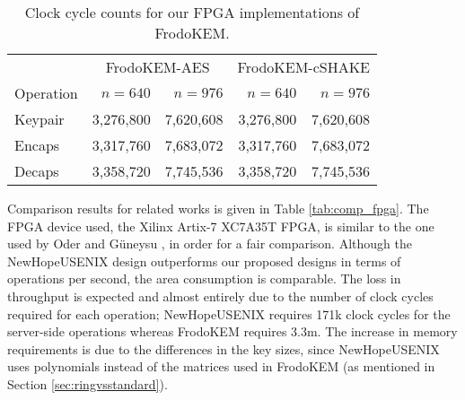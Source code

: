 \begin{table}[tbhp]
\caption{Clock cycle counts for our FPGA implementations of \textsf{FrodoKEM}.}
\label{tab:clks_fpga}
\begin{center}
\begin{tabular}{|l|r|r|r|r|}
\hline
& \multicolumn{2}{c|}{\textsf{FrodoKEM-AES}} &\multicolumn{2}{c|}{\textsf{FrodoKEM-cSHAKE}} \\
Operation	  & $n=640$ & $n=976$ & $n=640$ & $n=976$\\
\hline
Keypair							& 3,276,800 & 7,620,608 & 3,276,800 & 7,620,608 \\
Encaps							& 3,317,760 & 7,683,072 & 3,317,760 & 7,683,072 \\
Decaps							& 3,358,720 & 7,745,536 & 3,358,720 & 7,745,536 \\
\hline
\end{tabular}
\end{center}
\end{table}

Comparison results for related works is given in Table \ref{tab:comp_fpga}. The FPGA device used, the Xilinx Artix-7 XC7A35T FPGA, is similar to the one used by Oder and G{\"u}neysu \cite{oder2017implementing}, in order for a fair comparison. Although the \textsf{NewHopeUSENIX} design outperforms our proposed designs in terms of operations per second, the area consumption is comparable. The loss in throughput is expected and almost entirely due to the number of clock cycles required for each operation; \textsf{NewHopeUSENIX} requires 171k clock cycles for the server-side operations whereas \textsf{FrodoKEM} requires 3.3m. The increase in memory requirements is due to the differences in the key sizes, since \textsf{NewHopeUSENIX} uses polynomials instead of the matrices used in \textsf{FrodoKEM} (as mentioned in Section \ref{sec:ringvsstandard}).

